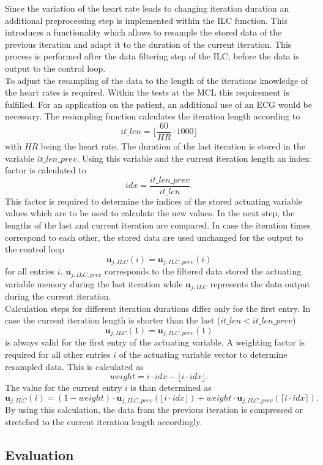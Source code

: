 Since the variation of the heart rate leads to changing iteration duration an additional preprocessing step is implemented within the ILC function. This introduces a functionality which allows to resample the stored data of the previous iteration and adapt it to the duration of the current iteration. This process is performed after the data filtering step of the ILC, before the data is output to the control loop.
\\To adjust the resampling of the data to the length of the iterations knowledge of the heart rates is required. Within the tests at the MCL this requirement is fulfilled. For an application on the patient, an additional use of an ECG would be necessary.
The resampling function calculates the iteration length according to
\begin{equation}
  it\_len = \lfloor\frac{60}{HR}\cdot1000\rfloor
\end{equation}
with $HR$ being the heart rate. The duration of the last iteration is stored in the variable $it\_len\_prev$. Using this variable and the current iteration length an index factor is calculated to
\begin{equation}
  idx = \frac{it\_len\_prev}{it\_len}.
\end{equation}
This factor is required to determine the indices of the stored actuating variable values which are to be used to calculate the new values.
In the next step, the lengths of the last and current iteration are compared. In case the iteration times correspond to each other, the stored data are used unchanged for the output to the control loop
\begin{equation}
  \mathbf{u}_{j,ILC}(i) = \mathbf{u}_{j,ILC,prev}(i)
\end{equation} for all entries $i$. $\mathbf{u}_{j,ILC,prev}$ corresponds to the filtered data stored the actuating variable memory during the last iteration while $\mathbf{u}_{j,ILC}$ represents the data output during the current iteration.
\\Calculation steps for different iteration durations differ only for the first entry. In case the current iteration length is shorter than the last ($it\_len<it\_len\_prev$)
\begin{equation}
  \mathbf{u}_{j,ILC}(1) = \mathbf{u}_{j,ILC,prev}(1)
\end{equation} is always valid for the first entry of the actuating variable.
A weighting factor is required for all other entries $i$ of the actuating variable vector to determine resampled data. This is calculated as
\begin{equation}
  weight= i \cdot idx - \lfloor i \cdot idx\rfloor.
\end{equation}
The value for the current entry $i$ is than determined as
\begin{equation}
  \mathbf{u}_{j,ILC}(i) = (1-weight) \cdot \mathbf{u}_{j,ILC,prev}(\lfloor i \cdot idx\rfloor) + weight\cdot \mathbf{u}_{j,ILC,prev}(\lceil i \cdot idx\rceil).
\end{equation}
By using this calculation, the data from the previous iteration is compressed or stretched to the current iteration length accordingly. 

\subsection{Evaluation}
